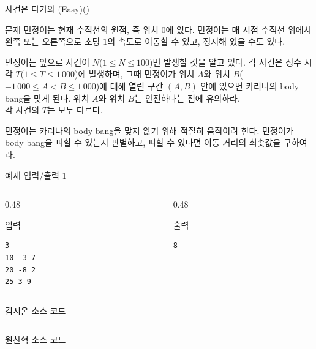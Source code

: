 ﻿

\begin{frame}[label=p4]{사건은 다가와 (Easy)(\prob)}
\small

\begin{block}{문제}
민정이는 현재 수직선의 원점, 즉 위치 $0$에 있다. 민정이는 매 시점 수직선 위에서 왼쪽 또는 오른쪽으로 초당 $1$의 속도로 이동할 수 있고, 정지해 있을 수도 있다.

민정이는 앞으로 사건이 $N$($1 \le N \le 100$)번 발생할 것을 알고 있다. 각 사건은 정수 시각 $T$($1 \le T \le 1\,000$)에 발생하며, 그때 민정이가 위치 $A$와 위치 $B$($-1\,000 \le A < B \le 1\,000$)에 대해 열린 구간 $(A, B)$ 안에 있으면 카리나의 body bang을 맞게 된다. 위치 $A$와 위치 $B$는 안전하다는 점에 유의하라. \\

각 사건의 $T$는 모두 다르다.

민정이는 카리나의 body bang을 맞지 않기 위해 적절히 움직이려 한다. 민정이가 body bang을 피할 수 있는지 판별하고, 피할 수 있다면 이동 거리의 최솟값을 구하여라.
\end{block}
\end{frame}

\begin{frame}[fragile]{예제 입력/출력 1}
\begin{columns}[T]
\begin{column}{0.48\textwidth}
\begin{block}{입력}
\begin{verbatim}
3
10 -3 7
20 -8 2
25 3 9
\end{verbatim}
\end{block}
\end{column}
\begin{column}{0.48\textwidth}
\begin{block}{출력}
\begin{verbatim}
8
\end{verbatim}
\end{block}
\end{column}
\end{columns}
\end{frame}

\begin{frame}{김시온 소스 코드}
\inputminted{java}{../src/\prob/sion/Main.java}
\end{frame}

\begin{frame}{원찬혁 소스 코드}
\inputminted{java}{../src/\prob/chanhyeok/Main.java}
\end{frame}

